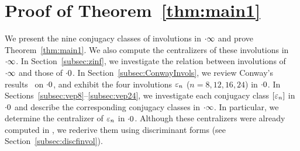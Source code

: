 \documentclass{amsart} %
\begin{document}
\section{Proof of Theorem~\ref{thm:main1}}\label{sec:proofofmain1}
%
We present the nine conjugacy classes of involutions in $\cdot \infty$
and prove Theorem~\ref{thm:main1}. 
We also compute the centralizers of these involutions in $\cdot \infty$.
In Section~\ref{subsec:zinf}, 
we investigate the relation between involutions of $\cdot \infty$ and those of $\cdot 0$.
In Section~\ref{subsec:ConwayInvols}, 
we review Conway's results~\cite[Chapter 10]{theCSbook} on $\cdot 0$, and 
exhibit the four involutions $\varepsilon_n$ ($n=8,12,16,24$) 
 in $\cdot 0$.
 In Sections~\ref{subsec:vep8}--\ref{subsec:vep24}, 
 we investigate each conjugacy class $[\varepsilon_n]$ in $\cdot 0$ and describe the corresponding conjugacy classes in $\cdot \infty$. 
In particular, 
we determine the centralizer of $\varepsilon_n$ in $\cdot 0$. 
Although these centralizers were already computed in \cite[Chapter~10]{theCSbook}, 
we rederive them using discriminant forms
 (see Section~\ref{subsec:discfinvol}).
%
%
\end{document}
